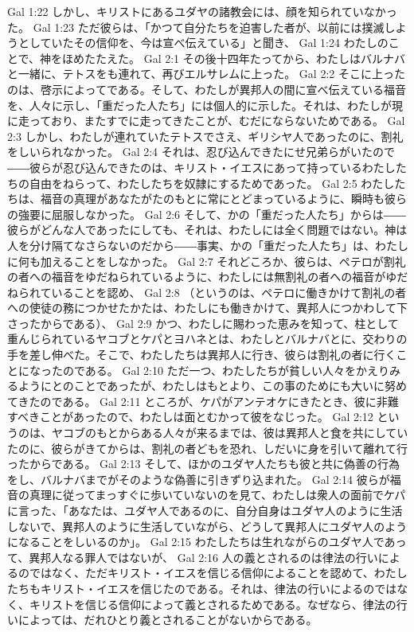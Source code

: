 Gal 1:22  しかし、キリストにあるユダヤの諸教会には、顔を知られていなかった。
Gal 1:23  ただ彼らは、「かつて自分たちを迫害した者が、以前には撲滅しようとしていたその信仰を、今は宣べ伝えている」と聞き、
Gal 1:24  わたしのことで、神をほめたたえた。
Gal 2:1  その後十四年たってから、わたしはバルナバと一緒に、テトスをも連れて、再びエルサレムに上った。
Gal 2:2  そこに上ったのは、啓示によってである。そして、わたしが異邦人の間に宣べ伝えている福音を、人々に示し、「重だった人たち」には個人的に示した。それは、わたしが現に走っており、またすでに走ってきたことが、むだにならないためである。
Gal 2:3  しかし、わたしが連れていたテトスでさえ、ギリシヤ人であったのに、割礼をしいられなかった。
Gal 2:4  それは、忍び込んできたにせ兄弟らがいたので――彼らが忍び込んできたのは、キリスト・イエスにあって持っているわたしたちの自由をねらって、わたしたちを奴隷にするためであった。
Gal 2:5  わたしたちは、福音の真理があなたがたのもとに常にとどまっているように、瞬時も彼らの強要に屈服しなかった。
Gal 2:6  そして、かの「重だった人たち」からは――彼らがどんな人であったにしても、それは、わたしには全く問題ではない。神は人を分け隔てなさらないのだから――事実、かの「重だった人たち」は、わたしに何も加えることをしなかった。
Gal 2:7  それどころか、彼らは、ペテロが割礼の者への福音をゆだねられているように、わたしには無割礼の者への福音がゆだねられていることを認め、
Gal 2:8  （というのは、ペテロに働きかけて割礼の者への使徒の務につかせたかたは、わたしにも働きかけて、異邦人につかわして下さったからである）、
Gal 2:9  かつ、わたしに賜わった恵みを知って、柱として重んじられているヤコブとケパとヨハネとは、わたしとバルナバとに、交わりの手を差し伸べた。そこで、わたしたちは異邦人に行き、彼らは割礼の者に行くことになったのである。
Gal 2:10  ただ一つ、わたしたちが貧しい人々をかえりみるようにとのことであったが、わたしはもとより、この事のためにも大いに努めてきたのである。
Gal 2:11  ところが、ケパがアンテオケにきたとき、彼に非難すべきことがあったので、わたしは面とむかって彼をなじった。
Gal 2:12  というのは、ヤコブのもとからある人々が来るまでは、彼は異邦人と食を共にしていたのに、彼らがきてからは、割礼の者どもを恐れ、しだいに身を引いて離れて行ったからである。
Gal 2:13  そして、ほかのユダヤ人たちも彼と共に偽善の行為をし、バルナバまでがそのような偽善に引きずり込まれた。
Gal 2:14  彼らが福音の真理に従ってまっすぐに歩いていないのを見て、わたしは衆人の面前でケパに言った、「あなたは、ユダヤ人であるのに、自分自身はユダヤ人のように生活しないで、異邦人のように生活していながら、どうして異邦人にユダヤ人のようになることをしいるのか」。
Gal 2:15  わたしたちは生れながらのユダヤ人であって、異邦人なる罪人ではないが、
Gal 2:16  人の義とされるのは律法の行いによるのではなく、ただキリスト・イエスを信じる信仰によることを認めて、わたしたちもキリスト・イエスを信じたのである。それは、律法の行いによるのではなく、キリストを信じる信仰によって義とされるためである。なぜなら、律法の行いによっては、だれひとり義とされることがないからである。
